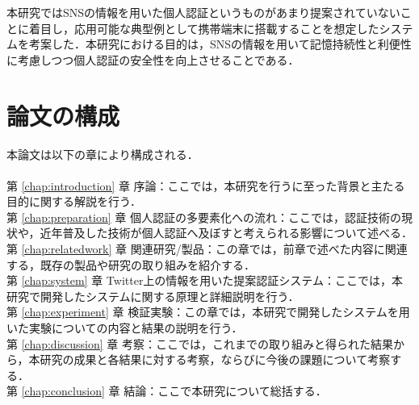 本研究ではSNSの情報を用いた個人認証というものがあまり提案されていないことに着目し，応用可能な典型例として携帯端末に搭載することを想定したシステムを考案した．本研究における目的は，SNSの情報を用いて記憶持続性と利便性に考慮しつつ個人認証の安全性を向上させることである．

\newpage

\section{論文の構成}
本論文は以下の章により構成される．\\
\\
第 \ref{chap:introduction} 章 序論：ここでは，本研究を行うに至った背景と主たる目的に関する解説を行う．\\
第 \ref{chap:preparation} 章 個人認証の多要素化への流れ：ここでは，認証技術の現状や，近年普及した技術が個人認証へ及ぼすと考えられる影響について述べる．\\
第 \ref{chap:relatedwork} 章 関連研究/製品：この章では，前章で述べた内容に関連する，既存の製品や研究の取り組みを紹介する．\\
第 \ref{chap:system} 章 Twitter上の情報を用いた提案認証システム：ここでは，本研究で開発したシステムに関する原理と詳細説明を行う．\\
第 \ref{chap:experiment} 章 検証実験：この章では，本研究で開発したシステムを用いた実験についての内容と結果の説明を行う．\\
第 \ref{chap:discussion} 章 考察：ここでは，これまでの取り組みと得られた結果から，本研究の成果と各結果に対する考察，ならびに今後の課題について考察する．\\
第 \ref{chap:conclusion} 章 結論：ここで本研究について総括する．\\

\newpage

